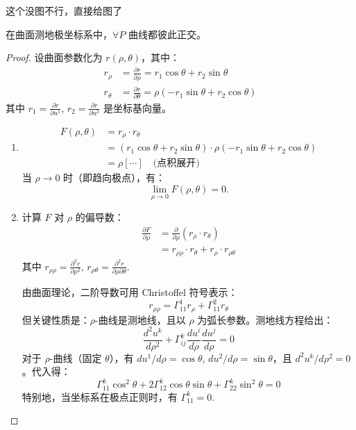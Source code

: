 \documentclass[lang=cn,10pt,thmcnt=section]{elegantbook}
\begin{document}
这个没图不行，直接给图了


\begin{lemma}[Gauss 引理]
    在曲面测地极坐标系中，\(\forall P\) 曲线都彼此正交。
\end{lemma}
\begin{proof}
    设曲面参数化为 \( r(\rho, \theta) \)，其中：
\begin{align*}
r_\rho &= \frac{\partial r}{\partial \rho} = r_1 \cos \theta + r_2 \sin \theta \\
r_\theta &= \frac{\partial r}{\partial \theta} = \rho (-r_1 \sin \theta + r_2 \cos \theta)
\end{align*}
其中 \( r_1 = \frac{\partial r}{\partial u^1} \), \( r_2 = \frac{\partial r}{\partial u^2} \) 是坐标基向量。

\begin{enumerate}
    \item \begin{align*}
        F(\rho, \theta) &= r_\rho \cdot r_\theta \\
        &= (r_1 \cos \theta + r_2 \sin \theta) \cdot \rho (-r_1 \sin \theta + r_2 \cos \theta) \\
        &= \rho \left[ \cdots \right] \quad \text{(点积展开)}
        \end{align*}
        当 \(\rho \to 0\) 时（即趋向极点），有：
        \[
        \lim_{\rho \to 0} F(\rho, \theta) = 0.
        \]
    
    \item 计算 \( F \) 对 \(\rho\) 的偏导数：
    \begin{align*}
    \frac{\partial F}{\partial \rho} &= \frac{\partial}{\partial \rho} (r_\rho \cdot r_\theta) \\
    &= r_{\rho\rho} \cdot r_\theta + r_\rho \cdot r_{\rho\theta}
    \end{align*}
    其中 \( r_{\rho\rho} = \frac{\partial^2 r}{\partial \rho^2} \), \( r_{\rho\theta} = \frac{\partial^2 r}{\partial \rho \partial \theta} \).
    
    由曲面理论，二阶导数可用 Christoffel 符号表示：
    \[
    r_{\rho\rho} = \Gamma_{11}^1 r_\rho + \Gamma_{11}^2 r_\theta
    \]
    但关键性质是：\(\rho\)-曲线是测地线，且以 \(\rho\) 为弧长参数。测地线方程给出：
    \[
    \frac{d^2 u^k}{d\rho^2} + \Gamma_{ij}^k \frac{du^i}{d\rho} \frac{du^j}{d\rho} = 0
    \]
    对于 \(\rho\)-曲线（固定 \(\theta\)），有 \( du^1/d\rho = \cos \theta \), \( du^2/d\rho = \sin \theta \)，且 \( d^2 u^k/d\rho^2 = 0 \)。代入得：
    \[
    \Gamma_{11}^k \cos^2 \theta + 2\Gamma_{12}^k \cos\theta \sin\theta + \Gamma_{22}^k \sin^2 \theta = 0
    \]
    特别地，当坐标系在极点正则时，有 \(\Gamma_{11}^k = 0\).
    

\end{enumerate}
\end{proof}
\end{document}
